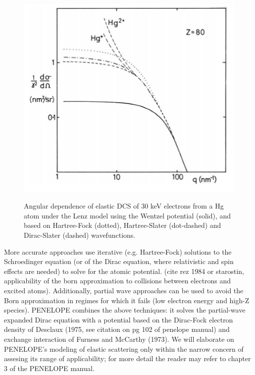 \documentclass [11pt, proquest, article] {uwthesis}[2016/11/22]
\begin{document}
\begin{figure}[h] 
	\caption{Angular dependence of elastic DCS of 30 keV electrons from a Hg atom under the Lenz model using the Wentzel potential (solid), and based on Hartree-Fock (dotted), Hartree-Slater (dot-dashed) and Dirac-Slater (dashed) wavefunctions.  \parencite{Reference1} }
\centering
\includegraphics[scale=0.5]{../Figures/egerton_3_3.png}
\label{fig:e3.3}
\end{figure}

More accurate approaches use iterative (e.g. Hartree-Fock) solutions to the Schroedinger equation (or of the Dirac equation, where relativistic and spin effects are needed) to solve for the atomic potential. (cite rez 1984 or starostin, applicability of the born approximation to collisions between electrons and excited atoms). Additionally, partial wave approaches can be used to avoid the Born approximation in regimes for which it fails (low electron energy and high-Z species). PENELOPE combines the above techniques: it solves the partial-wave expanded Dirac equation with a potential based on the Dirac-Fock electron density of Desclaux (1975, see citation on pg 102 of penelope manual) and exchange interaction of Furness and McCarthy (1973). We will elaborate on PENELOPE's modeling of elastic scattering only within the narrow concern of assesing its range of applicability; for more detail the reader may refer to chapter 3 of the PENELOPE manual. 
\end{document}

